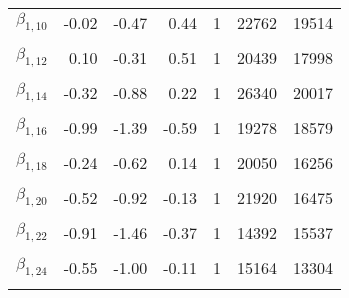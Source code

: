 \begin{table}
\begin{tabular}[t]{lrrrrrr}
$\beta_{1, 10}$ & -0.02 & -0.47 & 0.44 & 1 & 22762 & 19514\\
\cellcolor{gray!6}{$\beta_{1, 11}$} & \cellcolor{gray!6}{-0.74} & \cellcolor{gray!6}{-1.26} & \cellcolor{gray!6}{-0.24} & \cellcolor{gray!6}{1} & \cellcolor{gray!6}{17818} & \cellcolor{gray!6}{17887}\\
$\beta_{1, 12}$ & 0.10 & -0.31 & 0.51 & 1 & 20439 & 17998\\
\cellcolor{gray!6}{$\beta_{1, 13}$} & \cellcolor{gray!6}{-0.10} & \cellcolor{gray!6}{-0.50} & \cellcolor{gray!6}{0.30} & \cellcolor{gray!6}{1} & \cellcolor{gray!6}{21088} & \cellcolor{gray!6}{16422}\\
$\beta_{1, 14}$ & -0.32 & -0.88 & 0.22 & 1 & 26340 & 20017\\
\cellcolor{gray!6}{$\beta_{1, 15}$} & \cellcolor{gray!6}{-0.22} & \cellcolor{gray!6}{-0.60} & \cellcolor{gray!6}{0.17} & \cellcolor{gray!6}{1} & \cellcolor{gray!6}{25825} & \cellcolor{gray!6}{20444}\\
$\beta_{1, 16}$ & -0.99 & -1.39 & -0.59 & 1 & 19278 & 18579\\
\cellcolor{gray!6}{$\beta_{1, 17}$} & \cellcolor{gray!6}{-0.84} & \cellcolor{gray!6}{-1.21} & \cellcolor{gray!6}{-0.47} & \cellcolor{gray!6}{1} & \cellcolor{gray!6}{17262} & \cellcolor{gray!6}{15602}\\
$\beta_{1, 18}$ & -0.24 & -0.62 & 0.14 & 1 & 20050 & 16256\\
\cellcolor{gray!6}{$\beta_{1, 19}$} & \cellcolor{gray!6}{-0.31} & \cellcolor{gray!6}{-0.70} & \cellcolor{gray!6}{0.09} & \cellcolor{gray!6}{1} & \cellcolor{gray!6}{20716} & \cellcolor{gray!6}{17179}\\
$\beta_{1, 20}$ & -0.52 & -0.92 & -0.13 & 1 & 21920 & 16475\\
\cellcolor{gray!6}{$\beta_{1, 21}$} & \cellcolor{gray!6}{-0.38} & \cellcolor{gray!6}{-0.84} & \cellcolor{gray!6}{0.07} & \cellcolor{gray!6}{1} & \cellcolor{gray!6}{11096} & \cellcolor{gray!6}{12965}\\
$\beta_{1, 22}$ & -0.91 & -1.46 & -0.37 & 1 & 14392 & 15537\\
\cellcolor{gray!6}{$\beta_{1, 23}$} & \cellcolor{gray!6}{-0.67} & \cellcolor{gray!6}{-1.05} & \cellcolor{gray!6}{-0.28} & \cellcolor{gray!6}{1} & \cellcolor{gray!6}{20185} & \cellcolor{gray!6}{18629}\\
$\beta_{1, 24}$ & -0.55 & -1.00 & -0.11 & 1 & 15164 & 13304\\
\cellcolor{gray!6}{$\beta_{1, 25}$} & \cellcolor{gray!6}{-0.82} & \cellcolor{gray!6}{-1.36} & \cellcolor{gray!6}{-0.30} & \cellcolor{gray!6}{1} & \cellcolor{gray!6}{20796} & \cellcolor{gray!6}{18509}\\

\end{tabular}
\end{table}
